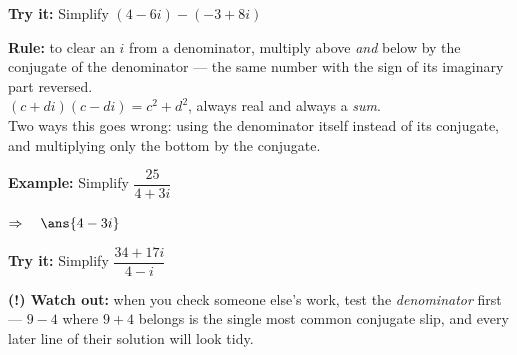 \documentclass[12pt]{article}
\begin{document}
\begin{tryitbox}
\textbf{Try it:} \quad Simplify $(4 - 6i) - (-3 + 8i)$\\[2pt]
\end{tryitbox}


\begin{formulabox}
\textbf{Rule:} to clear an $i$ from a denominator, multiply above \textit{and}
below by the conjugate of the denominator --- the same number with the sign of
its imaginary part reversed.\\[3pt]
$(c + di)(c - di) = c^{2} + d^{2}$, always real and always a \textit{sum}.\\[3pt]
Two ways this goes wrong: using the denominator itself instead of its conjugate,
and multiplying only the bottom by the conjugate.
\end{formulabox}

\begin{examplebox}
\textbf{Example:} \quad Simplify $\dfrac{25}{4 + 3i}$

$\Rightarrow\quad \ans{4 - 3i}$
\end{examplebox}

\begin{tryitbox}
\textbf{Try it:} \quad Simplify $\dfrac{34 + 17i}{4 - i}$\\[2pt]
\end{tryitbox}

\begin{watchoutbox}
\textbf{(!) Watch out:} when you check someone else's work, test the
\textit{denominator} first --- $9 - 4$ where $9 + 4$ belongs is the single most
common conjugate slip, and every later line of their solution will look tidy.
\end{watchoutbox}
\end{document}
